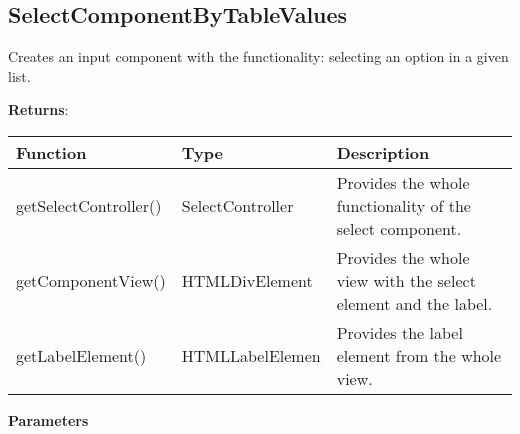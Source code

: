 \clearpage
\subsection*{SelectComponentByTableValues}

\vspace*{6pt}
Creates an input component with the functionality: selecting an option in a given list. 

\vspace*{18pt}
\noindent
\textbf{Returns}: 

\begin{table}[!htb] 
    \label{api:selectComponentByTableValuesReturn}
    \footnotesize
    \setlength\extrarowheight{4pt}
    \begin{tabular}{ p{3.5cm} p{3.5cm} p{6cm} }
        \toprule[1.2pt]
        \textbf{Function}     & \textbf{Type}    & \textbf{Description} \\
        \midrule
        getSelectController() & SelectController & Provides the whole functionality of the select component. \\
        getComponentView()    & HTMLDivElement   & Provides the whole view with the select element and the label. \\
        getLabelElement()     & HTMLLabelElemen  & Provides the label element from the whole view. \\
        \bottomrule[1.2pt]
    \end{tabular}
\end{table}

\vspace*{6pt}
\noindent
\textbf{Parameters}

